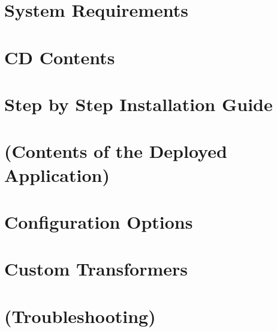 
\newcommand{\version}{0.1}
\newcommand{\documentname}{Administrator's \& Installation Manual}





\renewcommand{\contentsname}{Contents}
\tableofcontents
\bigskip

\newpage


\chapter{System Requirements}

\chapter{CD Contents}

\chapter{Step by Step Installation Guide}

\chapter{(Contents of the Deployed Application)}

\chapter{Configuration Options}

\chapter{Custom Transformers}

\chapter{(Troubleshooting)}



\appendix



